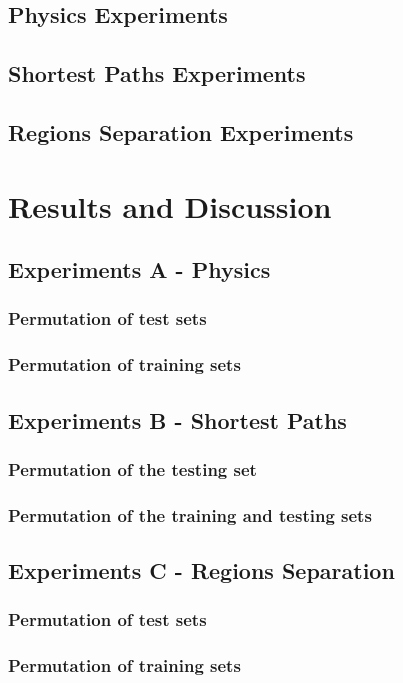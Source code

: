 \subsection{Physics Experiments}


\subsection{Shortest Paths Experiments}


\subsection{Regions Separation Experiments}



\section{Results and Discussion}


\subsection{Experiments A - Physics}

\subsubsection {Permutation of test sets}

\subsubsection {Permutation of training sets}


\subsection{Experiments B - Shortest Paths}

\subsubsection {Permutation of the testing set}

\subsubsection {Permutation of the training and testing sets}


\subsection{Experiments C - Regions Separation}

\subsubsection {Permutation of test sets}

\subsubsection {Permutation of training sets}